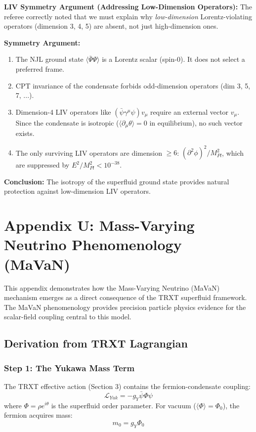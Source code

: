 \documentclass[a4paper,12pt]{article}
\begin{document}
\textbf{LIV Symmetry Argument (Addressing Low-Dimension Operators):}
The referee correctly noted that we must explain why \emph{low-dimension} Lorentz-violating operators (dimension 3, 4, 5) are absent, not just high-dimension ones.

\textbf{Symmetry Argument:}
\begin{enumerate}
    \item The NJL ground state $\langle \bar{\Psi}\Psi \rangle$ is a Lorentz scalar (spin-0). It does not select a preferred frame.
    \item CPT invariance of the condensate forbids odd-dimension operators (dim 3, 5, 7, ...).
    \item Dimension-4 LIV operators like $(\bar{\psi} \gamma^\mu \psi) v_\mu$ require an external vector $v_\mu$. Since the condensate is isotropic ($\langle \partial_\mu \theta \rangle = 0$ in equilibrium), no such vector exists.
    \item The only surviving LIV operators are dimension $\geq 6$: $(\partial^2 \phi)^2 / M_{Pl}^2$, which are suppressed by $E^2/M_{Pl}^2 < 10^{-38}$.
\end{enumerate}

\textbf{Conclusion:} The isotropy of the superfluid ground state provides natural protection against low-dimension LIV operators.

\section{Appendix U: Mass-Varying Neutrino Phenomenology (MaVaN)}

This appendix demonstrates how the Mass-Varying Neutrino (MaVaN) mechanism emerges as a direct consequence of the TRXT superfluid framework. The MaVaN phenomenology provides precision particle physics evidence for the scalar-field coupling central to this model.

\subsection{Derivation from TRXT Lagrangian}

\subsubsection{Step 1: The Yukawa Mass Term}
The TRXT effective action (Section 3) contains the fermion-condensate coupling:
\begin{equation}
    \mathcal{L}_{Yuk} = -g_Y \bar{\psi} \Phi \psi
\end{equation}
where $\Phi = \rho e^{i\theta}$ is the superfluid order parameter. For vacuum ($\langle\Phi\rangle = \Phi_0$), the fermion acquires mass:
\begin{equation}
    m_0 = g_Y \Phi_0
\end{equation}
\end{document}

